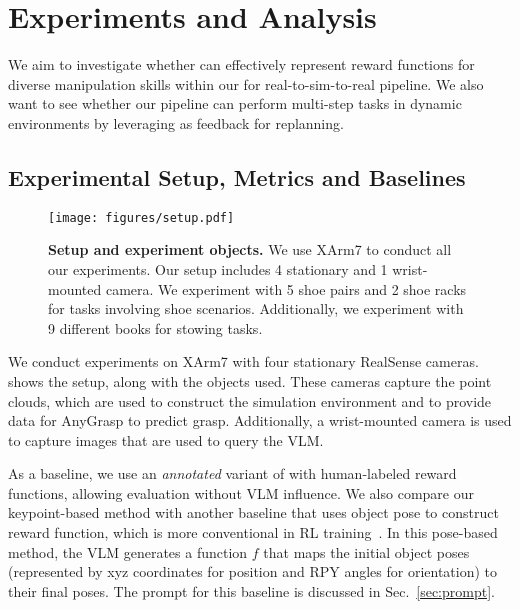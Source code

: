 

\section{Experiments and Analysis}
We aim to investigate whether \algname can effectively represent reward functions for diverse manipulation skills within our \algabrvname for real-to-sim-to-real pipeline. We also want to see whether our pipeline can  perform multi-step tasks in dynamic environments by leveraging \algname as feedback for replanning.


\subsection{Experimental Setup, Metrics and Baselines}
\begin{figure}[h]
    \centering
\texttt{[image: figures/setup.pdf]}
    \caption{\small{\textbf{Setup and experiment objects.} We use XArm7 to conduct all our experiments. Our setup includes 4 stationary and 1 wrist-mounted camera. We experiment with 5 shoe pairs and 2 shoe racks for tasks involving shoe scenarios. Additionally, we experiment with 9 different books for stowing tasks.}}
    \label{fig:objects}
    \vspace{-0.8em}
\end{figure}

We conduct experiments on XArm7 with four stationary RealSense cameras.  shows the setup, along with the objects used. These cameras capture the point clouds, which are used to construct the simulation environment and to provide data for AnyGrasp to predict grasp. Additionally, a wrist-mounted camera is used to capture images that are used to query the VLM. 

As a baseline, we use an \textit{annotated} variant of \algabrvname with human-labeled reward functions, allowing evaluation without VLM influence. We also compare our keypoint-based method with another baseline that uses object pose to construct reward function, which is more conventional in RL training~\cite{gu2017deep,popov2017data,vecerik2017leveraging,rajeswaran2017learning,qi2023hand}. In this pose-based method, the VLM generates a function $f$ that maps the initial object poses (represented by xyz coordinates for position and RPY angles for orientation) to their final poses. The prompt for this baseline is discussed in Sec.~\ref{sec:prompt}.


